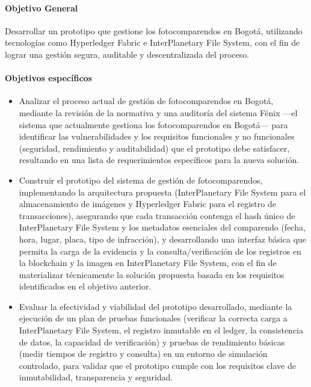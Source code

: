 \paragraph{Objetivo General}
Desarrollar un prototipo que gestione los fotocomparendos en Bogotá, utilizando tecnologías como Hyperledger Fabric e InterPlanetary File System, con el fin de lograr una gestión segura, auditable y descentralizada del proceso. 

\paragraph{Objetivos específicos}
\begin{itemize}
    \item Analizar el proceso actual de gestión de fotocomparendos en Bogotá, mediante la revisión de la normativa y una auditoría del sistema Fénix —el sistema que actualmente gestiona los fotocomparendos en Bogotá— para identificar las vulnerabilidades y los requisitos funcionales y no funcionales (seguridad, rendimiento y auditabilidad) que el prototipo debe satisfacer, resultando en una lista de requerimientos específicos para la nueva solución.
    \item Construir el prototipo del sistema de gestión de fotocomparendos, implementando la arquitectura propuesta (InterPlanetary File System para el almacenamiento de imágenes y Hyperledger Fabric para el registro de transacciones), asegurando que cada transacción contenga el hash único de InterPlanetary File System y los metadatos esenciales del comparendo (fecha, hora, lugar, placa, tipo de infracción), y desarrollando una interfaz básica que permita la carga de la evidencia y la consulta/verificación de los registros en la blockchain y la imagen en InterPlanetary File System, con el fin de materializar técnicamente la solución propuesta basada en los requisitos identificados en el objetivo anterior.
    \item Evaluar la efectividad y viabilidad del prototipo desarrollado, mediante la ejecución de un plan de pruebas funcionales (verificar la correcta carga a InterPlanetary File System, el registro inmutable en el ledger, la consistencia de datos, la capacidad de verificación) y pruebas de rendimiento básicas (medir tiempos de registro y consulta) en un entorno de simulación controlado, para validar que el prototipo cumple con los requisitos clave de inmutabilidad, transparencia y seguridad.
\end{itemize} 